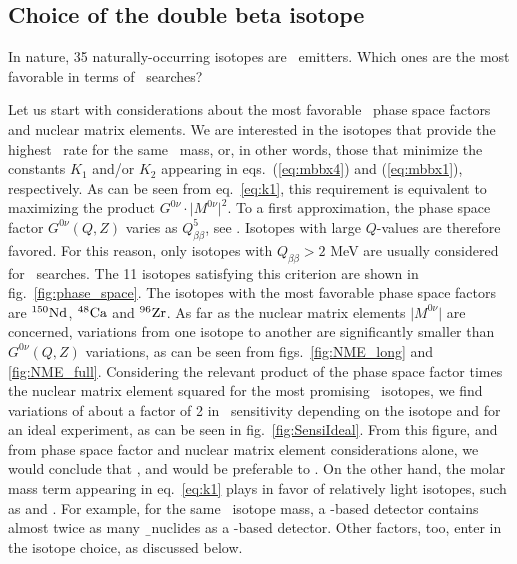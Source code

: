 
\subsection{Choice of the double beta isotope} \label{subsec:isotope}
In nature, 35 naturally-occurring isotopes are \bb\ emitters. Which ones are the most favorable in terms of \bbonu\ searches? 

Let us start with considerations about the most favorable \bbonu\ phase space factors and nuclear matrix elements. We are interested in the isotopes that provide the highest \bbonu\ rate for the same \mbb\ mass, or, in other words, those that minimize the constants $K_1$ and/or $K_2$ appearing in eqs.~(\ref{eq:mbbx4}) and (\ref{eq:mbbx1}), respectively. As can be seen from eq.~\ref{eq:k1}, this requirement is equivalent to maximizing the product $G^{0\nu}\cdot\lvert M^{0\nu}\rvert^2$. To a first approximation, the phase space factor $G^{0\nu}(Q,Z)$ varies as $Q_{\beta\beta}^5$, see \cite{Vogel:2008sx}. Isotopes with large $Q$-values are therefore favored. For this reason, only isotopes with $Q_{\beta\beta}>2$ MeV are usually considered for \bbonu\ searches. The 11 isotopes satisfying this criterion are shown in fig.~\ref{fig:phase_space}. The isotopes with the most favorable phase space factors are ${\rm ^{150}Nd}$, ${\rm ^{48}Ca}$ and ${\rm ^{96}Zr}$. As far as the nuclear matrix elements $\lvert M^{0\nu}\rvert$ are concerned, variations from one isotope to another are significantly smaller than $G^{0\nu}(Q,Z)$ variations, as can be seen from figs.~\ref{fig:NME_long} and \ref{fig:NME_full}. Considering the relevant product of the phase space factor times the nuclear matrix element squared for the most promising \bb\ isotopes, we find variations of about a factor of 2 in \mbb\ sensitivity depending on the isotope and for an ideal experiment, as can be seen in fig.~\ref{fig:SensiIdeal}. From this figure, and from phase space factor and nuclear matrix element considerations alone, we would conclude that ,  and  would be preferable to . On the other hand, the molar mass term appearing in eq.~\ref{eq:k1} plays in favor of relatively light isotopes, such as  and . For example, for the same \bb\ isotope mass, a -based detector contains almost twice as many \b\ nuclides as a -based detector. Other factors, too, enter in the isotope choice, as discussed below.
 

